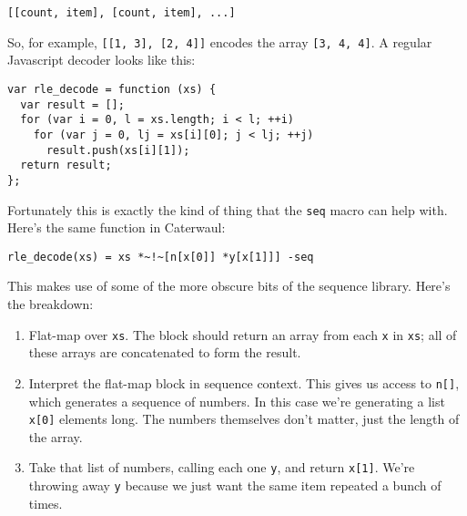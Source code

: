 \documentclass{report}
\begin{document}
\begin{verbatim}
[[count, item], [count, item], ...]
\end{verbatim}

  \noindent So, for example, \verb+[[1, 3], [2, 4]]+ encodes the array \verb+[3, 4, 4]+. A regular Javascript decoder looks like this:

\begin{verbatim}
var rle_decode = function (xs) {
  var result = [];
  for (var i = 0, l = xs.length; i < l; ++i)
    for (var j = 0, lj = xs[i][0]; j < lj; ++j)
      result.push(xs[i][1]);
  return result;
};
\end{verbatim}

  Fortunately this is exactly the kind of thing that the \verb+seq+ macro can help with. Here's the same function in Caterwaul:

\begin{verbatim}
rle_decode(xs) = xs *~!~[n[x[0]] *y[x[1]]] -seq
\end{verbatim}

  This makes use of some of the more obscure bits of the sequence library. Here's the breakdown:

\begin{enumerate}
\item[{\tt xs *\textasciitilde !}]
  Flat-map over {\tt xs}. The block should return an array from each {\tt x} in {\tt xs}; all of these arrays are concatenated to form the result.

\item[{\tt \textasciitilde[n[x[0]] ...]}]
  Interpret the flat-map block in sequence context. This gives us access to {\tt n[]}, which generates a sequence of numbers. In this case we're generating a list {\tt x[0]} elements long.
  The numbers themselves don't matter, just the length of the array.

\item[{\tt *y[x[1]]}]
  Take that list of numbers, calling each one {\tt y}, and return {\tt x[1]}. We're throwing away {\tt y} because we just want the same item repeated a bunch of times.
\end{enumerate}
\end{document}
